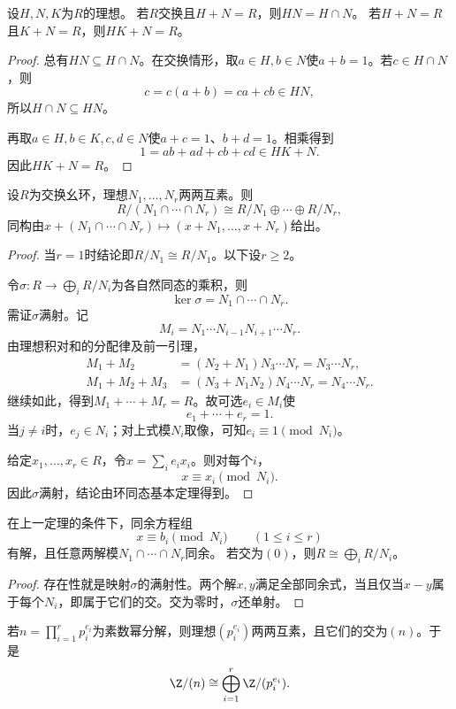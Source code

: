 \begin{lemma}\label{p2:ring-comaximal-product}
设$H,N,K$为$R$的理想。
若$R$交换且$H+N=R$，则$HN=H\cap N$。
若$H+N=R$且$K+N=R$，则$HK+N=R$。
\end{lemma}
\begin{proof}
总有$HN\subseteq H\cap N$。在交换情形，取$a\in H,b\in N$使$a+b=1$。若$c\in H\cap N$，则
\[
c=c(a+b)=ca+cb\in HN,
\]
所以$H\cap N\subseteq HN$。

再取$a\in H,b\in K,c,d\in N$使$a+c=1$、$b+d=1$。相乘得到
\[
1=ab+ad+cb+cd\in HK+N.
\]
因此$HK+N=R$。
\end{proof}

\begin{theorem}\label{p2:ring-crt}
设$R$为交换幺环，理想$N_1,\ldots,N_r$两两互素。则
\[
R/(N_1\cap\cdots\cap N_r)\cong R/N_1\oplus\cdots\oplus R/N_r,
\]
同构由$x+(N_1\cap\cdots\cap N_r)\mapsto(x+N_1,\ldots,x+N_r)$给出。
\end{theorem}
\begin{proof}
当$r=1$时结论即$R/N_1\cong R/N_1$。以下设$r\geq2$。

令$\sigma:R\to\bigoplus_iR/N_i$为各自然同态的乘积，则
\[
\ker\sigma=N_1\cap\cdots\cap N_r.
\]
需证$\sigma$满射。记
\[
M_i=N_1\cdots N_{i-1}N_{i+1}\cdots N_r.
\]
由理想积对和的分配律及前一引理，
\begin{align*}
M_1+M_2
&=(N_2+N_1)N_3\cdots N_r=N_3\cdots N_r,\\
M_1+M_2+M_3
&=(N_3+N_1N_2)N_4\cdots N_r=N_4\cdots N_r.
\end{align*}
继续如此，得到$M_1+\cdots+M_r=R$。故可选$e_i\in M_i$使
\[
e_1+\cdots+e_r=1.
\]
当$j\ne i$时，$e_j\in N_i$；对上式模$N_i$取像，可知$e_i\equiv1\pmod{N_i}$。

给定$x_1,\ldots,x_r\in R$，令$x=\sum_i e_ix_i$。则对每个$i$，
\[
x\equiv x_i\pmod{N_i}.
\]
因此$\sigma$满射，结论由环同态基本定理得到。
\end{proof}

\begin{corollary}\label{p2:ring-crt-congruence}
在上一定理的条件下，同余方程组
\[
x\equiv b_i\pmod{N_i}\qquad(1\leq i\leq r)
\]
有解，且任意两解模$N_1\cap\cdots\cap N_r$同余。
若交为$(0)$，则$R\cong\bigoplus_i R/N_i$。
\end{corollary}
\begin{proof}
存在性就是映射$\sigma$的满射性。两个解$x,y$满足全部同余式，当且仅当$x-y$属于每个$N_i$，即属于它们的交。交为零时，$\sigma$还单射。
\end{proof}

\begin{example}
若$n=\prod_{i=1}^r p_i^{e_i}$为素数幂分解，则理想$(p_i^{e_i})$两两互素，且它们的交为$(n)$。于是
\[
\Z/(n)\cong\bigoplus_{i=1}^r\Z/(p_i^{e_i}).
\]
\end{example}

